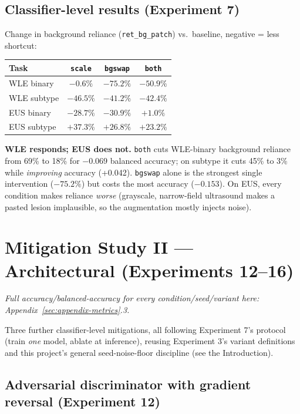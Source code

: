 \documentclass[10pt]{article}
\begin{document}
\subsection{Classifier-level results (Experiment 7)}

Change in background reliance (\texttt{ret\_bg\_patch}) vs.\ baseline, negative = less shortcut:

\begin{center}
\begin{tabular}{lccc}
\toprule
Task & \texttt{scale} & \texttt{bgswap} & \texttt{both} \\
\midrule
WLE binary & $-0.6\%$ & \textbf{$-75.2\%$} & $-50.9\%$ \\
WLE subtype & $-46.5\%$ & $-41.2\%$ & $-42.4\%$ \\
EUS binary & $-28.7\%$ & $-30.9\%$ & $+1.0\%$ \\
EUS subtype & $+37.3\%$ & $+26.8\%$ & $+23.2\%$ \\
\bottomrule
\end{tabular}
\end{center}

\textbf{WLE responds; EUS does not.} \texttt{both} cuts WLE-binary background reliance from 69\% to 18\% for
$-0.069$ balanced accuracy; on subtype it cuts 45\% to 3\% while \emph{improving} accuracy (+0.042).
\texttt{bgswap} alone is the strongest single intervention ($-75.2\%$) but costs the most accuracy
($-0.153$). On EUS, every condition makes reliance \emph{worse} (grayscale, narrow-field ultrasound makes a
pasted lesion implausible, so the augmentation mostly injects noise).


\clearpage
\section{Mitigation Study II --- Architectural (Experiments 12--16)}
\label{sec:mit2}

\noindent\textit{Full accuracy/balanced-accuracy for every condition/seed/variant here: Appendix~\ref{sec:appendix-metrics}.3.}

Three further classifier-level mitigations, all following Experiment 7's protocol (train \emph{one} model,
ablate at inference), reusing Experiment 3's variant definitions and this project's general seed-noise-floor
discipline (see the Introduction).

\subsection{Adversarial discriminator with gradient reversal (Experiment 12)}
\end{document}
